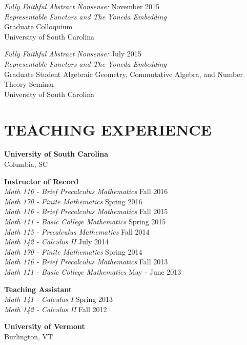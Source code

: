 \documentclass[line,overlapped]{res}
\begin{document}
\begin{resume}
         {\sl Fully Faithful Abstract Nonsense:} \hfill November 2015\\
         {\sl Representable Functors and The Yoneda Embedding}\\
         Graduate Colloquium\\
         University of South Carolina

         {\sl Fully Faithful Abstract Nonsense:} \hfill July 2015\\
         {\sl Representable Functors and The Yoneda Embedding}\\
         Graduate Student Algebraic Geometry, Commutative Algebra, and Number Theory Seminar\\
         University of South Carolina

 \section{TEACHING EXPERIENCE}
         {\bf University of South Carolina}\\Columbia, SC
         
         {\bf Instructor of Record}\\
         {\sl Math 116 - Brief Precalculus Mathematics} \hfill Fall 2016\\
         {\sl Math 170 - Finite Mathematics} \hfill Spring 2016\\
         {\sl Math 116 - Brief Precalculus Mathematics} \hfill Fall 2015\\
         {\sl Math 111 - Basic College Mathematics} \hfill Spring 2015\\
         {\sl Math 115 - Precalculus Mathematics} \hfill Fall 2014\\
         {\sl Math 142 - Calculus II} \hfill July 2014\\
         {\sl Math 170 - Finite Mathematics} \hfill Spring 2014\\
         {\sl Math 116 - Brief Precalculus Mathematics} \hfill Fall 2013\\
         {\sl Math 111 - Basic College Mathematics} \hfill May - June 2013

         {\bf Teaching Assistant}\\
         {\sl Math 141 - Calculus I} \hfill Spring 2013\\
         {\sl Math 142 - Calculus II} \hfill Fall 2012

         \newpage 
         {\bf University of Vermont}\\Burlington, VT
         

\end{resume}
\end{document}
